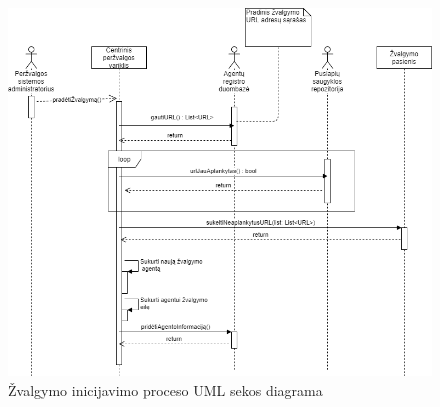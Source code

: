 \begin{figure}[ht!]
\centering
\includegraphics[scale=0.6]{img/initiate_crawling_process_sequence.png}
\caption{Žvalgymo inicijavimo proceso UML sekos diagrama}
\label{fig:initiate_crawling_uml_sequence}
\end{figure}
